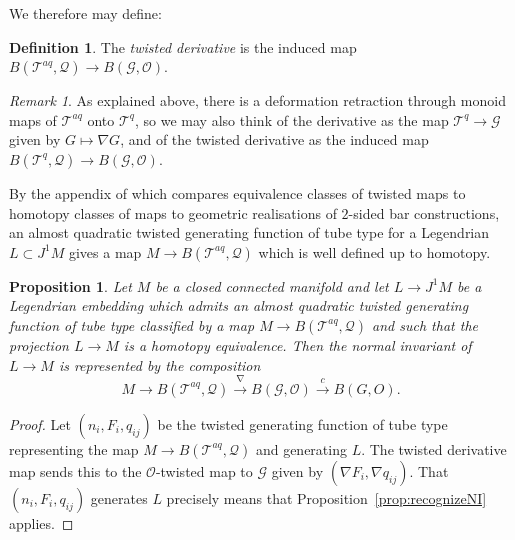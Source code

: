 \documentclass[reqno]{amsart}
\theoremstyle{theorem}
\newtheorem{proposition}[corollary]{Proposition}
\theoremstyle{remark}
\newtheorem{remark}[corollary]{Remark}
\theoremstyle{definition}
\newtheorem{definition}[corollary]{Definition}
\newcommand{\T}{\mathcal{T}}
\newcommand{\GG}{\mathcal{G}}
\newcommand{\QQ}{\mathcal{Q}}
\newcommand{\OO}{\mathcal{O}}
\begin{document}
We therefore may define:


\begin{definition}\label{def: twisted derivative}
The \emph{twisted derivative} is the induced map  $B(\T^{aq}, \QQ) \to B( \GG, \OO)$. 
\end{definition}


\begin{remark}\label{rem:deriv-quad}
As explained above, there is a deformation retraction through monoid maps of $\T^{aq}$ onto $\T^q$, so we may also think of the derivative as the map $\T^q \to \GG$ given by $G \mapsto \nabla G$, and of the  twisted derivative as the induced map $B(\T^q, \QQ) \to B( \GG, \OO)$.
\end{remark}




By the appendix of \cite{ACGK} which compares equivalence classes of twisted maps to homotopy classes of maps to geometric realisations of $2$-sided bar constructions, an almost quadratic twisted generating function of tube type for a Legendrian $L \subset J^1 M$ gives a map $M \to B(\T^{aq}, \QQ)$ which is well defined up to homotopy. 




\begin{proposition}\label{prop:normal-deriv}
Let $M$ be a closed connected manifold and let $L \to J^1M$ be a Legendrian embedding which admits an almost quadratic twisted generating function of tube type classified by a map $M \to B(\T^{aq}, \QQ)$ and such that the projection $L \to M$ is a homotopy equivalence. Then the normal invariant of $L\to M$ is represented by
the composition 
\[M \to B(\T^{aq}, \QQ) \xrightarrow{\nabla} B( \GG, \OO) \xrightarrow{c} B(G,O).\]
\end{proposition}


\begin{proof}
  Let $(n_i,F_i,q_{ij})$ be the twisted generating function of tube type representing the map $M \to B(\T^{aq}, \QQ)$ and generating $L$. The twisted derivative map sends this to the $\OO$-twisted map to $\GG$ given by $(\nabla F_i, \nabla q_{ij})$. That $(n_i,F_i,q_{ij})$ generates $L$ precisely means that Proposition~\ref{prop:recognizeNI} applies.
\end{proof}
\end{document}
